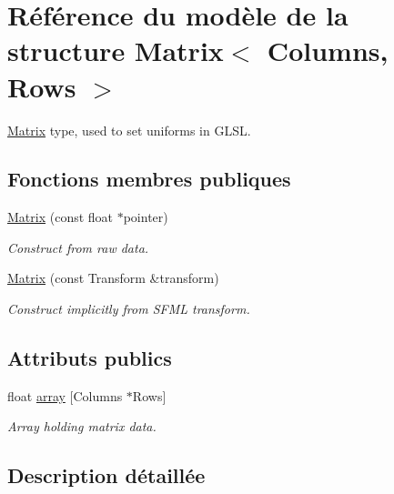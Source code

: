 \hypertarget{structMatrix}{}\section{Référence du modèle de la structure Matrix$<$ Columns, Rows $>$}
\label{structMatrix}


\hyperlink{structMatrix}{Matrix} type, used to set uniforms in G\+L\+SL.  


\subsection*{Fonctions membres publiques}
\begin{DoxyCompactItemize}
\item 
\hyperlink{structMatrix_ad40da72f526bcd6854d83496d2f62e01}{Matrix} (const float $\ast$pointer)
\begin{DoxyCompactList}\small\item\em Construct from raw data. \end{DoxyCompactList}\item 
\hyperlink{structMatrix_acc8ec3ddfe33a01f9ae7970d8fed9855}{Matrix} (const Transform \&transform)
\begin{DoxyCompactList}\small\item\em Construct implicitly from S\+F\+ML transform. \end{DoxyCompactList}\end{DoxyCompactItemize}
\subsection*{Attributs publics}
\begin{DoxyCompactItemize}
\item 
\mbox{\label{structMatrix_a494cc3a7a34398ec21992ba83018d9f4}} 
float \hyperlink{structMatrix_a494cc3a7a34398ec21992ba83018d9f4}{array} \mbox{[}Columns $\ast$Rows\mbox{]}
\begin{DoxyCompactList}\small\item\em Array holding matrix data. \end{DoxyCompactList}\end{DoxyCompactItemize}


\subsection{Description détaillée}
